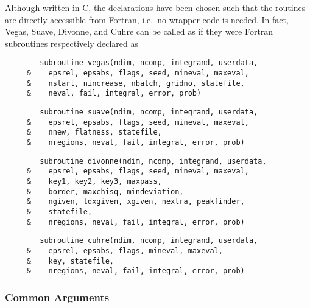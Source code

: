 \documentclass[12pt]{article}
\newcommand\ie{i.e.\ }
\begin{document}
Although written in C, the declarations have been chosen such that the
routines are directly accessible from Fortran, \ie no wrapper code is
needed.  In fact, Vegas, Suave, Divonne, and Cuhre can be called as if 
they were Fortran subroutines respectively declared as
\begin{verbatim}
        subroutine vegas(ndim, ncomp, integrand, userdata,
     &    epsrel, epsabs, flags, seed, mineval, maxeval,
     &    nstart, nincrease, nbatch, gridno, statefile,
     &    neval, fail, integral, error, prob)
\end{verbatim}
\begin{verbatim}
        subroutine suave(ndim, ncomp, integrand, userdata,
     &    epsrel, epsabs, flags, seed, mineval, maxeval,
     &    nnew, flatness, statefile,
     &    nregions, neval, fail, integral, error, prob)
\end{verbatim}
\begin{verbatim}
        subroutine divonne(ndim, ncomp, integrand, userdata,
     &    epsrel, epsabs, flags, seed, mineval, maxeval,
     &    key1, key2, key3, maxpass,
     &    border, maxchisq, mindeviation,
     &    ngiven, ldxgiven, xgiven, nextra, peakfinder,
     &    statefile,
     &    nregions, neval, fail, integral, error, prob)
\end{verbatim}
\begin{verbatim}
        subroutine cuhre(ndim, ncomp, integrand, userdata,
     &    epsrel, epsabs, flags, mineval, maxeval,
     &    key, statefile,
     &    nregions, neval, fail, integral, error, prob)
\end{verbatim}


\subsubsection{Common Arguments}
\label{sect:commonargs}
\end{document}
